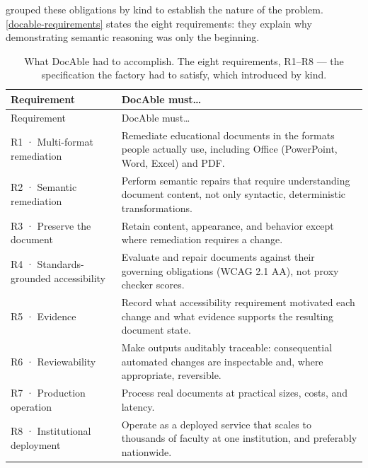  grouped these obligations by kind to establish the nature of the problem. \autoref{docable-requirements} states the eight requirements: they explain why demonstrating semantic reasoning was only the beginning.

{\footnotesize
\begin{longtable}[]{@{}
  >{\raggedright\arraybackslash}p{}
  >{\raggedright\arraybackslash}p{}@{}}
\caption[The DocAble requirements]{What DocAble had to accomplish. The eight requirements, R1--R8 --- the specification the factory had to satisfy, which  introduced by kind.}\label{docable-requirements}\tabularnewline
\toprule\noalign{}
\begin{minipage}[b]{\linewidth}\raggedright
Requirement
\end{minipage} & \begin{minipage}[b]{\linewidth}\raggedright
DocAble must\ldots{}
\end{minipage} \\
\midrule\noalign{}
\endfirsthead
\toprule\noalign{}
\begin{minipage}[b]{\linewidth}\raggedright
Requirement
\end{minipage} & \begin{minipage}[b]{\linewidth}\raggedright
DocAble must\ldots{}
\end{minipage} \\
\midrule\noalign{}
\endhead
\bottomrule\noalign{}
\endlastfoot

R1 · Multi-format remediation & Remediate educational documents in the formats people actually use, including Office (PowerPoint, Word, Excel) and PDF. \\
R2 · Semantic remediation & Perform semantic repairs that require understanding document content, not only syntactic, deterministic transformations. \\
R3 · Preserve the document & Retain content, appearance, and behavior except where remediation requires a change. \\
R4 · Standards-grounded accessibility & Evaluate and repair documents against their governing obligations (WCAG 2.1 AA), not proxy checker scores. \\
R5 · Evidence & Record what accessibility requirement motivated each change and what evidence supports the resulting document state. \\
R6 · Reviewability & Make outputs auditably traceable: consequential automated changes are inspectable and, where appropriate, reversible. \\
R7 · Production operation & Process real documents at practical sizes, costs, and latency. \\
R8 · Institutional deployment & Operate as a deployed service that scales to thousands of faculty at one institution, and preferably nationwide. \\
\end{longtable}
}

